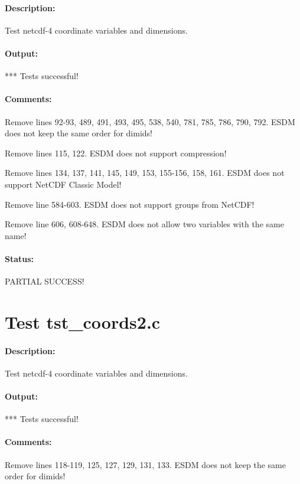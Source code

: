 \paragraph{Description:} Test netcdf-4 coordinate variables and dimensions.

\paragraph{Output:} *** Tests successful!

\paragraph{Comments:} Remove lines 92-93, 489, 491, 493, 495, 538, 540, 781, 785, 786, 790, 792. ESDM does not keep the same order for dimids!

Remove lines 115, 122. ESDM does not support compression!

Remove lines 134, 137, 141, 145, 149, 153, 155-156, 158, 161. ESDM does not support NetCDF Classic Model!

Remove line 584-603. ESDM does not support groups from NetCDF!

Remove line 606, 608-648. ESDM does not allow two variables with the same name!

\paragraph{Status:} PARTIAL SUCCESS!

\section{Test tst\_coords2.c}

\paragraph{Description:} Test netcdf-4 coordinate variables and dimensions.

\paragraph{Output:} *** Tests successful!

\paragraph{Comments:} Remove lines 118-119, 125, 127, 129, 131, 133. ESDM does not keep the same order for dimids!

